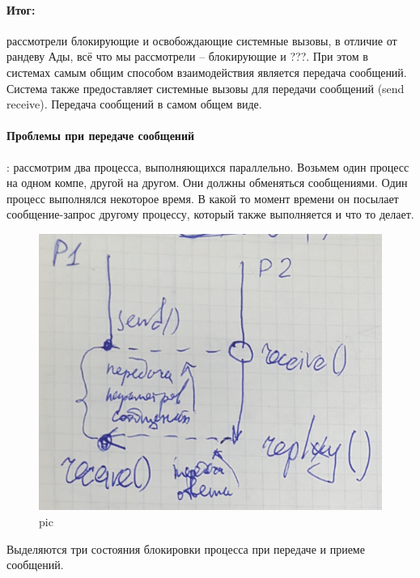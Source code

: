 \paragraph{Итог:} рассмотрели блокирующие и освобождающие системные вызовы, в отличие от рандеву Ады, всё что мы рассмотрели – блокирующие и ???. При этом в системах самым общим способом взаимодействия является передача сообщений. Система также предоставляет системные вызовы для передачи сообщений (send receive). Передача сообщений в самом общем виде.

\paragraph{Проблемы при передаче сообщений}: рассмотрим два процесса, выполняющихся параллельно.  Возьмем один процесс на одном компе, другой на другом. Они должны обменяться сообщениями. Один процесс выполнялся некоторое время. В какой то момент времени он посылает сообщение-запрос другому процессу, который также выполняется и что то делает. 

\begin{figure}[H]
    \centering
    \includegraphics[width=\textwidth]{pic/1.png}
    \caption{pic}
\end{figure}

Выделяются три состояния блокировки процесса при передаче и приеме сообщений.

